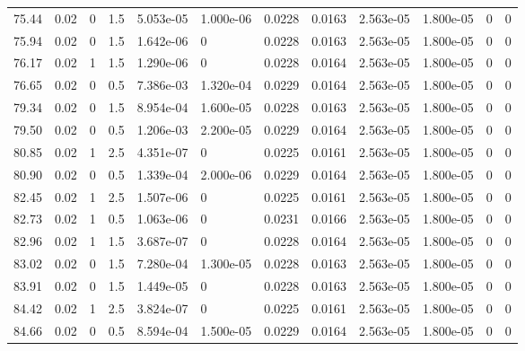 \documentclass[preview]{standalone}
\begin{document}
{{{\begin{tabular}{L{1.2cm}C{1.2cm} C{0.3cm}C{0.5cm} C{1.4cm}C{1.4cm} C{1.4cm}C{1.4cm} C{1.6cm}C{1.6cm} C{1.6cm}C{1.6cm}}
  75.44  &  0.02  & 0     & 1.5 &  5.053e-05  & 1.000e-06  &  0.0228&   0.0163& 2.563e-05 & 1.800e-05   &  0 & 0  \\ 
  75.94  &  0.02  & 0     & 1.5 &  1.642e-06  & 0  &  0.0228&   0.0163& 2.563e-05 & 1.800e-05   &  0 & 0  \\ 
  76.17  &  0.02  & 1     & 1.5 &  1.290e-06  & 0  &  0.0228&   0.0164& 2.563e-05 & 1.800e-05   &  0 & 0  \\ 
  76.65  &  0.02  & 0     & 0.5 &  7.386e-03  & 1.320e-04  &  0.0229&   0.0164& 2.563e-05 & 1.800e-05   &  0 & 0  \\ 
  79.34  &  0.02  & 0     & 1.5 &  8.954e-04  & 1.600e-05  &  0.0228&   0.0163& 2.563e-05 & 1.800e-05   &  0 & 0  \\ 
  79.50  &  0.02  & 0     & 0.5 &  1.206e-03  & 2.200e-05  &  0.0229&   0.0164& 2.563e-05 & 1.800e-05   &  0 & 0  \\ 
  80.85  &  0.02  & 1     & 2.5 &  4.351e-07  & 0  &  0.0225&   0.0161& 2.563e-05 & 1.800e-05   &  0 & 0  \\ 
  80.90  &  0.02  & 0     & 0.5 &  1.339e-04  & 2.000e-06  &  0.0229&   0.0164& 2.563e-05 & 1.800e-05   &  0 & 0  \\ 
  82.45  &  0.02  & 1     & 2.5 &  1.507e-06  & 0  &  0.0225&   0.0161& 2.563e-05 & 1.800e-05   &  0 & 0  \\ 
  82.73  &  0.02  & 1     & 0.5 &  1.063e-06  & 0  &  0.0231&   0.0166& 2.563e-05 & 1.800e-05   &  0 & 0  \\ 
  82.96  &  0.02  & 1     & 1.5 &  3.687e-07  & 0  &  0.0228&   0.0164& 2.563e-05 & 1.800e-05   &  0 & 0  \\ 
  83.02  &  0.02  & 0     & 1.5 &  7.280e-04  & 1.300e-05  &  0.0228&   0.0163& 2.563e-05 & 1.800e-05   &  0 & 0  \\ 
  83.91  &  0.02  & 0     & 1.5 &  1.449e-05  & 0  &  0.0228&   0.0163& 2.563e-05 & 1.800e-05   &  0 & 0  \\ 
  84.42  &  0.02  & 1     & 2.5 &  3.824e-07  & 0  &  0.0225&   0.0161& 2.563e-05 & 1.800e-05   &  0 & 0  \\ 
  84.66  &  0.02  & 0     & 0.5 &  8.594e-04  & 1.500e-05  &  0.0229&   0.0164& 2.563e-05 & 1.800e-05   &  0 & 0  \\ 
\hline 
\end{tabular} 

}}}
\end{document}
